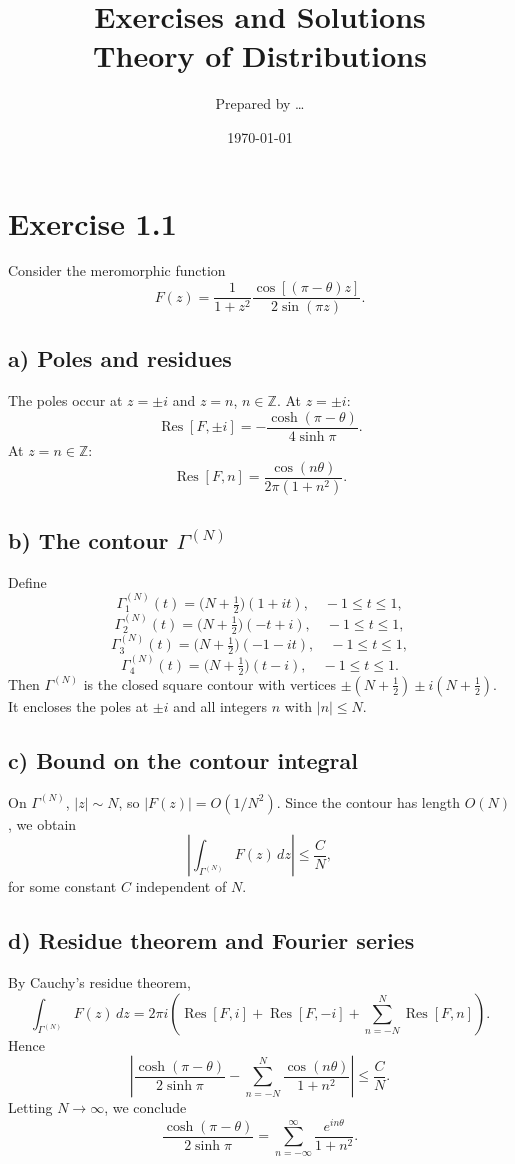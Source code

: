 \documentclass[11pt,a4paper]{article}
\title{Exercises and Solutions \\[0.5em]
	\large Theory of Distributions}
\author{Prepared by \dots}
\date{\today}
\begin{document}
	\maketitle
	
	\section*{Exercise 1.1}
	Consider the meromorphic function
	\[
	F(z) = \frac{1}{1+z^2} \frac{\cos[(\pi-\theta)z]}{2\sin(\pi z)}.
	\]
	
	\subsection*{a) Poles and residues}
	The poles occur at $z=\pm i$ and $z=n$, $n\in\mathbb{Z}$.  
	At $z=\pm i$:
	\[
	\operatorname{Res}[F,\pm i] = -\frac{\cosh(\pi-\theta)}{4\sinh \pi}.
	\]
	At $z=n\in\mathbb{Z}$:
	\[
	\operatorname{Res}[F,n] = \frac{\cos(n\theta)}{2\pi(1+n^2)}.
	\]
	
	\subsection*{b) The contour $\Gamma^{(N)}$}
	Define
	\[
	\Gamma^{(N)}_1(t) = \Big(N+\tfrac{1}{2}\Big)(1+it), \quad -1\leq t\leq 1,
	\]
	\[
	\Gamma^{(N)}_2(t) = \Big(N+\tfrac{1}{2}\Big)(-t+i), \quad -1\leq t\leq 1,
	\]
	\[
	\Gamma^{(N)}_3(t) = \Big(N+\tfrac{1}{2}\Big)(-1-it), \quad -1\leq t\leq 1,
	\]
	\[
	\Gamma^{(N)}_4(t) = \Big(N+\tfrac{1}{2}\Big)(t-i), \quad -1\leq t\leq 1.
	\]
	Then $\Gamma^{(N)}$ is the closed square contour with vertices
	$\pm(N+\tfrac{1}{2}) \pm i(N+\tfrac{1}{2})$.
	It encloses the poles at $\pm i$ and all integers $n$ with $|n|\leq N$.
	
	\subsection*{c) Bound on the contour integral}
	On $\Gamma^{(N)}$, $|z|\sim N$, so $|F(z)|=O(1/N^2)$.  
	Since the contour has length $O(N)$, we obtain
	\[
	\left| \int_{\Gamma^{(N)}} F(z)\,dz \right| \leq \frac{C}{N},
	\]
	for some constant $C$ independent of $N$.
	
	\subsection*{d) Residue theorem and Fourier series}
	By Cauchy's residue theorem,
	\[
	\int_{\Gamma^{(N)}} F(z)\,dz
	= 2\pi i \left( \operatorname{Res}[F,i]+\operatorname{Res}[F,-i] + \sum_{n=-N}^N \operatorname{Res}[F,n]\right).
	\]
	Hence
	\[
	\left| \frac{\cosh(\pi-\theta)}{2\sinh \pi}
	- \sum_{n=-N}^N \frac{\cos(n\theta)}{1+n^2} \right| \leq \frac{C}{N}.
	\]
	Letting $N\to\infty$, we conclude
	\[
	\frac{\cosh(\pi-\theta)}{2\sinh \pi}
	= \sum_{n=-\infty}^\infty \frac{e^{in\theta}}{1+n^2}.
	\]
	
\end{document}
